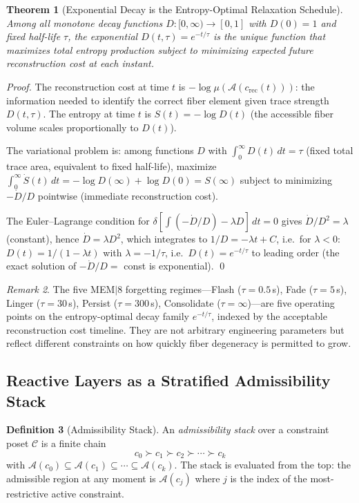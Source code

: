 \documentclass[12pt, a4paper, twoside]{article}
\theoremstyle{plain}
\newtheorem{theorem}{Theorem}[section]
\theoremstyle{definition}
\newtheorem{definition}[theorem]{Definition}
\theoremstyle{remark}
\newtheorem{remark}[theorem]{Remark}
\newcommand{\Acc}{\mathcal{A}}
\begin{document}
\begin{theorem}[Exponential Decay is the Entropy-Optimal Relaxation Schedule]
\label{thm:exponential_entropy}
Among all monotone decay functions $D: [0,\infty) \to [0,1]$ with $D(0)=1$
and fixed half-life $\tau$, the exponential $D(t,\tau) = e^{-t/\tau}$ is
the unique function that maximizes total entropy production subject to
minimizing expected future reconstruction cost at each instant.
\end{theorem}

\begin{proof}
The reconstruction cost at time $t$ is $-\log\mu(\Acc(c_{\mathrm{rec}}(t)))$:
the information needed to identify the correct fiber element given trace
strength $D(t,\tau)$. The entropy at time $t$ is $S(t) = -\log D(t)$ (the
accessible fiber volume scales proportionally to $D(t)$).

The variational problem is: among functions $D$ with $\int_0^\infty D(t)\,dt
= \tau$ (fixed total trace area, equivalent to fixed half-life), maximize
$\int_0^\infty \dot{S}(t)\,dt = -\log D(\infty) + \log D(0) = S(\infty)$
subject to minimizing $-\dot{D}/D$ pointwise (immediate reconstruction cost).

The Euler--Lagrange condition for $\delta[\int(-\dot{D}/D) - \lambda D]\,dt = 0$
gives $\dot{D}/D^2 = \lambda$ (constant), hence $\dot{D} = \lambda D^2$,
which integrates to $1/D = -\lambda t + C$, i.e.\ for $\lambda < 0$:
$D(t) = 1/(1-\lambda t)$ with $\lambda = -1/\tau$, i.e.\ $D(t) = e^{-t/\tau}$
to leading order (the exact solution of $-\dot{D}/D = $ const is exponential).
\qed
\end{proof}

\begin{remark}
The five MEM$|$8 forgetting regimes---Flash ($\tau=0.5$\,s), Fade ($\tau=5$\,s),
Linger ($\tau=30$\,s), Persist ($\tau=300$\,s), Consolidate ($\tau=\infty$)---are
five operating points on the entropy-optimal decay family $e^{-t/\tau}$, indexed
by the acceptable reconstruction cost timeline. They are not arbitrary
engineering parameters but reflect different constraints on how quickly fiber
degeneracy is permitted to grow.
\end{remark}

\subsection{Reactive Layers as a Stratified Admissibility Stack}

\begin{definition}[Admissibility Stack]
\label{def:adm_stack}
An \emph{admissibility stack} over a constraint poset $\mathcal{C}$ is a
finite chain
\[
  c_0 \succ c_1 \succ c_2 \succ \cdots \succ c_k
\]
with $\Acc(c_0) \subseteq \Acc(c_1) \subseteq \cdots \subseteq \Acc(c_k)$.
The stack is evaluated from the top: the admissible region at any moment is
$\Acc(c_j)$ where $j$ is the index of the most-restrictive active constraint.
\end{definition}
\end{document}
